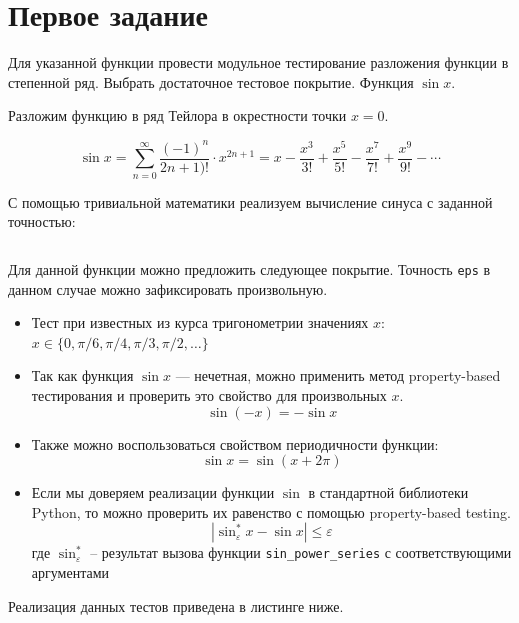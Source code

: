 \section{Первое задание}
Для указанной функции провести модульное тестирование разложения
функции в степенной ряд.
Выбрать достаточное тестовое покрытие.
Функция \( \sin x \).

Разложим функцию в ряд Тейлора в окрестности точки \(x = 0 \).

\[
	\sin x =
	\sum_{n = 0}^\infty \frac {(-1)^n}{2n+1)!} \cdot x^{2n + 1} =
	x - \frac{x^3}{3!} + \frac{x^5}{5!} - \frac{x^7}{7!} + \frac{x^9}{9!} - \cdots
\]

С помощью тривиальной математики реализуем вычисление синуса с заданной точностью:

\inputminted{python}{./solution/solution.py}

Для данной функции можно предложить следующее покрытие.
Точность \texttt{eps} в данном случае можно зафиксировать произвольную.
\begin{itemize}
	\item Тест при известных из курса тригонометрии
	      значениях \(x\):
	      \(x \in \{ 0, \pi/6, \pi/4, \pi/3, \pi/2, \ldots \} \)
	\item Так как функция \( \sin x \) --- нечетная, можно применить
	      метод property-based тестирования и проверить это свойство
	      для произвольных \(x \).
	      \[ \sin (-x) = - \sin x \]
	\item Также можно воспользоваться свойством периодичности функции:
	      \[ \sin x = \sin (x + 2 \pi) \]
	\item Если мы доверяем реализации функции \( \sin \) в стандартной библиотеки
	      Python, то можно проверить их равенство с помощью property-based testing.
	      \[ | \sin_\varepsilon^* x - \sin x | \leq \varepsilon \]
	      где \( \sin_\varepsilon^* \) -- результат вызова функции \texttt{sin\_power\_series} с соответствующими аргументами
\end{itemize}

Реализация данных тестов приведена в листинге ниже.
\inputminted{python}{./solution/tests.py}
